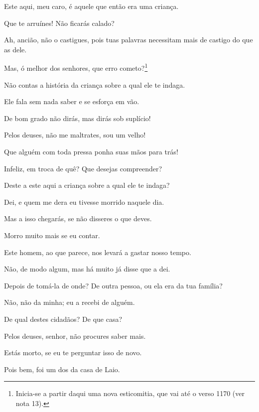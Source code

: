    Este aqui, meu caro, é aquele que então era uma criança.

   Que te arruínes! Não ficarás calado?

   Ah, ancião, não o castigues, pois tuas palavras necessitam mais de
castigo do que as dele.

   Mas, ó melhor dos senhores, que erro cometo?\footnote{Inicia-se a partir daqui uma nova esticomitia,
  que vai até o verso 1170 (ver nota 13).}

   Não contas a história da criança sobre a qual ele te indaga.

   Ele fala sem nada saber e se esforça em vão.

   De bom grado não dirás, mas dirás sob suplício!

   Pelos deuses, não me maltrates, sou um velho!

   Que alguém com toda pressa ponha suas mãos para trás!

   Infeliz, em troca de quê? Que desejas compreender?

   Deste a este aqui a criança sobre a qual ele te indaga?

   Dei, e quem me dera eu tivesse morrido naquele dia.

   Mas a isso chegarás, se não disseres o que deves.

   Morro muito mais se eu contar.

   Este homem, ao que parece, nos levará a gastar nosso tempo.

   Não, de modo algum, mas há muito já disse que a dei.

   Depois de tomá-la de onde? De outra pessoa, ou ela era da tua família?

   Não, não da minha; eu a recebi de alguém.

   De qual destes cidadãos? De que casa?

   Pelos deuses, senhor, não procures saber mais.

   Estás morto, se eu te perguntar isso de novo.

   Pois bem, foi um dos da casa de Laio.


